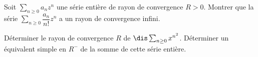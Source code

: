 \documentclass[a4paper,10pt]{report}
\newcommand{\Sum}[2]{\ensuremath{\textstyle{\sum\limits_{#1}^{#2}}}}
\begin{document}

\begin{Exercice}{} Soit $\Sum{n \geq 0}{} a_n z^n$ une série entière de rayon de convergence $R>0$. Montrer que  la série $\Sum{n \geq 0}{} \dfrac{a_n}{n!}z^n$ a un rayon de convergence infini. 
\end{Exercice}


\begin{Exercice}{} Déterminer le rayon de convergence $R$ de $\dis \sum_{n \geq 0} x^{n^2}$. Déterminer un équivalent simple en $R^{-}$ de la somme de cette série entière.
\end{Exercice}
\end{document}
